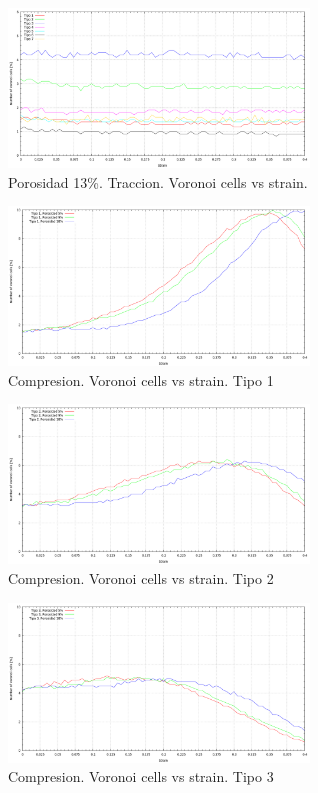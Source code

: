 \documentclass[10pt, oneside]{article} %
\begin{document}
\begin{figure}[H]
\centering
\includegraphics[width=8cm]{Figures/Porosidad_13_noVoronoi_strain_trac.png}
\caption{Porosidad 13\%. Traccion. Voronoi cells vs strain.}
\end{figure}

\begin{figure}[H]
\centering
\includegraphics[width=8cm]{Figures/Porosidad_noVoronoi_strain_tipo1_comp.png}
\caption{Compresion. Voronoi cells vs strain. Tipo 1}
\end{figure}

\begin{figure}[H]
\centering
\includegraphics[width=8cm]{Figures/Porosidad_noVoronoi_strain_tipo2_comp.png}
\caption{Compresion. Voronoi cells vs strain. Tipo 2}
\end{figure}

\begin{figure}[H]
\centering
\includegraphics[width=8cm]{Figures/Porosidad_noVoronoi_strain_tipo3_comp.png}
\caption{Compresion. Voronoi cells vs strain. Tipo 3}
\end{figure}
\end{document}

